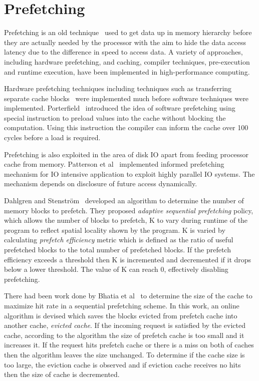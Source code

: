\section{Prefetching}
Prefetching is an old technique~\cite{anacker68}\cite{Smith1982}\cite{Vanderwiel2000}
used to get data up in memory hierarchy before they are actually needed by the processor
with the aim to hide the data access latency due to the difference in speed to access
data. A variety of approaches, including hardware prefetching, and caching, compiler
techniques, pre-execution and runtime execution, have been implemented in
high-performance computing.

Hardware prefetching techniques including techniques such as transferring separate
cache blocks~\cite{Smith1978} were implemented much before software techniques were
implemented. Porterfield~\cite{Porterfield1989} introduced the idea of software prefetching
using special instruction to preload values into the cache without blocking the
computation. Using this instruction the compiler can inform the cache over 100
cycles before a load is required.

Prefetching is also exploited in the area of disk IO apart from feeding processor cache
from memory. Patterson et al~\cite{Patterson1994} implemented informed prefetching
mechanism for IO intensive application to exploit highly parallel IO systems. The
mechanism depends on disclosure of future access dynamically.

Dahlgren and Stenström~\cite{Dahlgren1993} developed an algorithm to determine the
number of memory blocks to prefetch. They proposed
\textit{adaptive sequential prefetching} policy, which allows the number of blocks
to prefetch, K to vary during runtime of the program to reflect spatial locality
shown by the program. K is varied by calculating \textit{prefetch efficiency} metric
which is defined as the ratio of useful prefetched blocks to the total number of
prefetched blocks. If the prefetch efficiency exceeds a threshold then K is
incremented and decremented if it drops below a lower threshold. The value of K
can reach 0, effectively disabling prefetching.

There had been work done by Bhatia et al~\cite{Bhatia2010} to determine the size of
the cache to maximize hit rate in a sequential prefetching scheme. In this work, an
online algorithm is devised which saves the blocks evicted from prefetch cache
into another cache, \textit{evicted cache}. If the incoming request is satisfied
by the evicted cache, according to the algorithm the size of prefetch cache is too
small and it increases it. If the request hits prefetch cache or there is a miss
on both of caches then the algorithm leaves the size unchanged. To determine if
the cache size is too large, the eviction cache is observed and if eviction cache
receives no hits then the size of cache is decremented.

